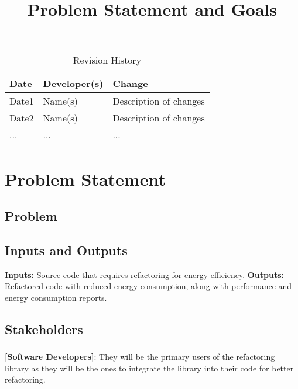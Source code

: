 \documentclass{article}
\title{Problem Statement and Goals\\\progname}
\author{\authname}
\date{}
\begin{document}
\maketitle

\begin{table}[hp]
  \caption{Revision History} \label{TblRevisionHistory}
  \begin{tabularx}{\textwidth}{llX}
    \toprule
    \textbf{Date} & \textbf{Developer(s)} & \textbf{Change}\\
    \midrule
    Date1 & Name(s) & Description of changes\\
    Date2 & Name(s) & Description of changes\\
    ... & ... & ...\\
    \bottomrule
  \end{tabularx}
\end{table}

\section{Problem Statement}



\subsection{Problem}

\subsection{Inputs and Outputs}


\textbf{Inputs:} Source code that requires refactoring for energy efficiency.
\textbf{Outputs:} Refactored code with reduced energy consumption, along with performance and energy consumption reports.

\subsection{Stakeholders}
\subsubsection*{\color{blue}{Direct Stakeholders}}
\textbf{[Software Developers]}: They will be the primary users of the refactoring library as they will be the ones to integrate the library into their code for better refactoring.\\
\end{document}
